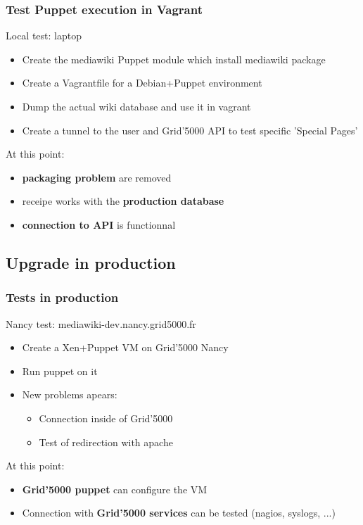 \documentclass[11pt,compress,final]{beamer}
\begin{document}
\begin{frame}
\frametitle{Test Puppet execution in Vagrant}
\begin{block}{Local test: laptop}
\begin{itemize}
\item Create the mediawiki Puppet module which install mediawiki package
\item Create a Vagrantfile for a Debian+Puppet environment
\item Dump the actual wiki database and use it in vagrant
\item Create a tunnel to the user and Grid'5000 API to test specific 'Special Pages'
\end{itemize}
\end{block}
At this point:
\begin{itemize}
\item \textbf{packaging problem} are removed
\item receipe works with the \textbf{production database}
\item \textbf{connection to API} is functionnal
\end{itemize}
\end{frame}

\subsection{Upgrade in production}
\begin{frame}
\frametitle{Tests in production}
\begin{block}{Nancy test: mediawiki-dev.nancy.grid5000.fr}
\begin{itemize}
\item Create a Xen+Puppet VM on Grid'5000 Nancy 
\item Run puppet on it
\item New problems apears:
\begin{itemize}
\item Connection inside of Grid'5000
\item Test of redirection with apache
\end{itemize}
\end{itemize}
\end{block}
At this point:
\begin{itemize}
\item \textbf{Grid'5000 puppet} can configure the VM
\item Connection with \textbf{Grid'5000 services} can be tested (nagios, syslogs, ...)
\end{itemize}
\end{frame}
\end{document}
